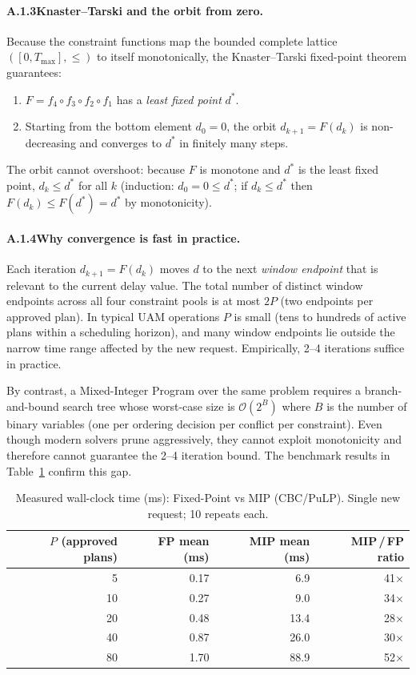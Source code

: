 \documentclass[12pt,a4paper]{article}
\begin{document}
\paragraph{A.1.3\quad Knaster--Tarski and the orbit from zero.}
Because the constraint functions map the bounded complete lattice
$([0, T_{\max}], \le)$ to itself monotonically, the Knaster--Tarski
fixed-point theorem guarantees:

\begin{enumerate}[label=(\roman*)]
  \item $F = f_4 \circ f_3 \circ f_2 \circ f_1$ has a \emph{least
    fixed point} $d^*$.
  \item Starting from the bottom element $d_0 = 0$, the orbit
    $d_{k+1} = F(d_k)$ is non-decreasing and converges to $d^*$
    in finitely many steps.
\end{enumerate}

The orbit cannot overshoot: because $F$ is monotone and $d^*$ is the
least fixed point, $d_k \le d^*$ for all $k$ (induction: $d_0=0 \le
d^*$; if $d_k \le d^*$ then $F(d_k) \le F(d^*) = d^*$ by
monotonicity).

\paragraph{A.1.4\quad Why convergence is fast in practice.}
Each iteration $d_{k+1} = F(d_k)$ moves $d$ to the next
\emph{window endpoint} that is relevant to the current delay value.
The total number of distinct window endpoints across all four constraint
pools is at most $2P$ (two endpoints per approved plan).
In typical UAM operations $P$ is small (tens to hundreds of active
plans within a scheduling horizon), and many window endpoints lie
outside the narrow time range affected by the new request.
Empirically, 2--4 iterations suffice in practice.

\medskip
By contrast, a Mixed-Integer Program over the same problem requires a
branch-and-bound search tree whose worst-case size is
$\mathcal{O}(2^{B})$ where $B$ is the number of binary variables
(one per ordering decision per conflict per constraint).  Even though
modern solvers prune aggressively, they cannot exploit monotonicity and
therefore cannot guarantee the 2--4 iteration bound.
The benchmark results in Table~\ref{tab:benchmark} confirm this gap.

\begin{table}[h]
\centering
\caption{Measured wall-clock time (ms): Fixed-Point vs MIP (CBC/PuLP).
         Single new request; 10 repeats each.}
\label{tab:benchmark}
\begin{tabular}{rrrr}
\toprule
$P$ (approved plans) & FP mean (ms) & MIP mean (ms) & MIP\,/\,FP ratio \\
\midrule
  5 & 0.17 &   6.9 & 41$\times$ \\
 10 & 0.27 &   9.0 & 34$\times$ \\
 20 & 0.48 &  13.4 & 28$\times$ \\
 40 & 0.87 &  26.0 & 30$\times$ \\
 80 & 1.70 &  88.9 & 52$\times$ \\
\bottomrule
\end{tabular}
\end{table}
\end{document}
